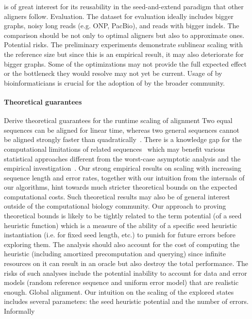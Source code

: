 is of great interest for its reusability in the seed-and-extend paradigm that
other aligners follow. Evaluation. The dataset for evaluation ideally includes
bigger graphs, noisy long reads (e.g. ONP, PacBio), and reads with bigger
indels. The comparison should be not only to optimal aligners but also to
approximate ones. Potential risks. The preliminary experiments demonstrate
sublinear scaling with the reference size but since this is an empirical result,
it may also deteriorate for bigger graphs. Some of the optimizations may not
provide the full expected effect or the bottleneck they would resolve may not
yet be current. Usage of \astarix by bioinformaticians is crucial for the
adoption of \astarix by the broader community.

\paragraph{Theoretical guarantees}
Derive theoretical guarantees for the runtime scaling of \A alignment Two equal
sequences can be aligned for linear time, whereas two general sequences cannot
be aligned strongly faster than quadratically~\cite{backurs2015edit}. There is a
knowledge gap for the computational limitations of related
sequences~\citep{medvedev2022limitations} which may benefit various statistical
approaches different from the worst-case asymptotic analysis and the empirical
investigation~\citep{medvedev2022theoretical}. Our strong empirical results on
scaling with increasing sequence length and error rates, together with our
intuition from the internals of our \A algorithms, hint towards much stricter
theoretical bounds on the expected computational costs. Such theoretical results
may also be of general interest outside of the computational biology community.
Our approach to proving theoretical bounds is likely to be tightly related to
the term potential (of a seed heuristic function) which is a measure of the
ability of a specific seed heuristic instantiation (i.e. for fixed seed length,
etc.) to punish for future errors before exploring them. The analysis should
also account for the cost of computing the heuristic (including amortized
precomputation and querying) since infinite resources on it can result in an
oracle but also destroy the total performance. The risks of such analyses
include the potential inability to account for data and error models (random
reference sequence and uniform error model) that are realistic enough. Global
alignment. Our intuition on the scaling of the explored states includes several
parameters: the seed heuristic potential and the number of errors. Informally

